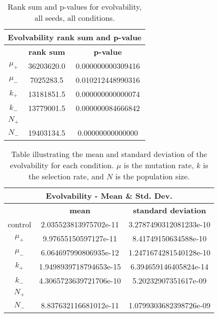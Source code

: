 \begin{table}[H]
	\begin{tabular}{|c|c|c|}
		\hline
		\multicolumn{3}{c}{\Large \textbf{Evolvability rank sum and p-value}} \\
		\hline
		& \textbf{rank sum} & \textbf{p-value} \\
		\hline
		$\mu_+$ & 36203620.0 & 0.000000000309416 \\
		\hline
		$\mu_-$ & 7025283.5 & 0.010212448990316 \\
		\hline
		$k_+$ & 13181851.5 & 0.000000000000074 \\
		\hline
		$k_-$ & 13779001.5 & 0.000000084666842 \\
		\hline
		$N_+$ & & \\
		\hline
		$N_-$ & 19403134.5 & 0.00000000000000 \\
		\hline
	\end{tabular}
	\caption[Evolvability - rank sum and p-value]{Rank sum and p-values for evolvability, all seeds, all conditions.}
	\label{table:evolvability-rank_sum_and_p-values}
\end{table}

\begin{table}[H]
	\centering
	\begin{tabular}{| c | c | c |}
		\hline
		\multicolumn{3}{c}{\Large Evolvability - Mean \& Std. Dev.} \\
		\hline
		& \textbf{mean} & \textbf{standard deviation}\\
		\hline
		\hline
		control & 2.035523813975702e-11 & 3.2787490312081233e-10\\
		\hline
		$\mu_+$ & 9.97655150597127e-11 & 8.41749150634588e-10 \\
		\hline
		$\mu_-$ & 6.064697990806935e-12 & 1.2471674281540128e-10 \\
		\hline
		$k_+$ & 1.9498939718794653e-15 & 6.394659146405824e-14 \\
		\hline
		$k_-$ & 4.3065723639721706e-10 & 5.20232907351617e-09 \\
		\hline
		$N_+$ &  & \\
		\hline
		$N_-$ & 8.837632116681012e-11 &  1.0799303682398726e-09 \\
		\hline	 		 
	\end{tabular}
	\caption[Evolvability mean and standard deviation]{Table illustrating the mean and standard deviation of the evolvability for each condition. $\mu$ is the mutation rate, $k$ is the selection rate, and $N$ is the population size.}
	\label{table:mean_std_dev_evolvability}
\end{table}

